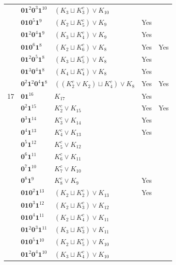 \documentclass[preprint]{elsarticle}
\begin{document}
\begin{center}
\begin{longtable}{p{0.7cm} p{2cm} p{4cm} p{1cm} p{0cm}}
&$\mathbf{0}\mathbf{1}^2 \mathbf{0}^3 \mathbf{1}^{10}$ & $( K_{3} \sqcup K_{3}^c) \vee K_{10}$ & &\\
&$\mathbf{0}\mathbf{1}\mathbf{0}^{5} \mathbf{1}^9$ & $ (K_{2} \sqcup K_{5}^c )\vee K_{9}$ & Yes&\\
&$\mathbf{0}\mathbf{1}^2 \mathbf{0}^4 \mathbf{1}^9$ & $ (K_{3} \sqcup K_{4}^c )\vee K_{9}$ & Yes&\\
&$\mathbf{0}\mathbf{1}\mathbf{0}^6\mathbf{1}^8$ & $ (K_{2} \sqcup K_{6}^c )\vee K_{8}$ & Yes& Yes\\
&$\mathbf{0}\mathbf{1}^2\mathbf{0}^5 \mathbf{1}^8$ & $ (K_{3} \sqcup K_{5}^c )\vee K_{8}$ & Yes&\\
&$\mathbf{0}\mathbf{1}^3 \mathbf{0}^4 \mathbf{1}^8$ & $ (K_{4} \sqcup K_{4}^c )\vee K_{8}$ & Yes&\\
&$\mathbf{0}^2 \mathbf{1}^2 \mathbf{0}^4 \mathbf{1}^8$ & $ ((K_{2}^c \vee K_{2}) \sqcup K_{4}^c) \vee K_{8}$ & Yes& Yes\\
\hline
17&$\mathbf{0}\mathbf{1}^{16}$ & $ K_{17}$ &Yes &\\
&$\mathbf{0}^2 \mathbf{1}^{15}$ & $ K_{2}^c \vee K_{15}$ &Yes &Yes\\
&$\mathbf{0}^{3} \mathbf{1}^{14}$ & $ K_{3}^c \vee K_{14}$ &Yes &\\
&$\mathbf{0}^{4} \mathbf{1}^{13}$ & $ K_{4}^c \vee K_{13}$ &Yes &\\
&$\mathbf{0}^5 \mathbf{1}^{12}$ & $ K_{5}^c \vee K_{12}$ & &\\
&$\mathbf{0}^6 \mathbf{1}^{11}$ & $ K_{6}^c \vee K_{11}$ & &\\
&$\mathbf{0}^{7} \mathbf{1}^{10}$ & $ K_{7}^c \vee K_{10}$ & &\\
&$\mathbf{0}^8 \mathbf{1}^{9}$ & $ K_{8}^c \vee K_{9}$ &Yes &\\
&$\mathbf{0}\mathbf{1}\mathbf{0}^2 \mathbf{1}^{13}$ & $ (K_{2} \sqcup K_{2}^c) \vee K_{13}$ &Yes &\\
&$\mathbf{0}\mathbf{1}\mathbf{0}^3 \mathbf{1}^{12}$ & $ (K_{2} \sqcup K_{3}^c )\vee K_{12}$ & &\\
&$\mathbf{0}\mathbf{1}\mathbf{0}^4 \mathbf{1}^{11}$ & $ (K_{2} \sqcup K_{4}^c )\vee K_{11}$ & &\\
&$\mathbf{0}\mathbf{1}^2 \mathbf{0}^3 \mathbf{1}^{11}$ & $( K_{3} \sqcup K_{3}^c) \vee K_{11}$ & &\\
&$\mathbf{0}\mathbf{1}\mathbf{0}^5 \mathbf{1}^{10}$ & $ (K_{2} \sqcup K_{5}^c )\vee K_{10}$ & &\\
&$\mathbf{0}\mathbf{1}^2 \mathbf{0}^4 \mathbf{1}^{10}$ & $( K_{3} \sqcup K_{4}^c) \vee K_{10}$ & &\\

\end{longtable}
\end{center}
\end{document}
